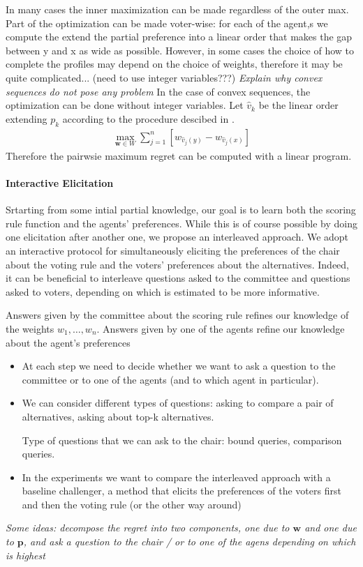 \documentclass[12pt]{article}
\newcommand{\pprofile}{\textbf{p}}%
\newcommand{\w}{\textbf{w}}%
\begin{document}
In many cases the inner maximization can be made regardless of the outer max.
Part of the optimization can be made voter-wise: for each of the agent,s we compute the extend the partial preference into a linear order that makes the gap between y and x as wide as possible.
However, in some cases the choice of how to complete the profiles may depend on the choice of weights, therefore it may be quite complicated...  (need to use integer variables???)
\medskip
 {\em Explain why convex sequences do not pose any problem}
In the case of convex sequences, the optimization can be done without integer variables.
Let $\hat{v}_k$ be the linear order extending $p_k$ according to the procedure descibed in \cite{Lu2011}.
\begin{align*}
\max_{\w \in W} \sum_{j=1}^{n}  [w_{\hat{v}_j(y)} - w_{\hat{v}_j(x)}]
\end{align*}
Therefore the pairwsie maximum regret can be computed with a linear program.


\paragraph{Interactive Elicitation}
Srtarting from some intial partial knowledge, our goal is to learn both the scoring rule function and the agents' preferences.
While this is of course possible by doing one elicitation after another one, we propose an interleaved approach.
We adopt an interactive  protocol for simultaneously eliciting the preferences of the chair about the voting rule and the voters' preferences about the alternatives.
Indeed, it can be beneficial to interleave questions asked to the committee and questions asked to voters, depending on which is estimated to be more informative.

Answers given by the committee about the scoring rule refines our knowledge of the weights $w_1,\ldots,w_n$.
Answers given by one of the agents refine our knowledge about the agent's preferences

\begin{itemize}
\item At each step we need to decide whether we want to ask a question to the committee or to one of the agents (and to which agent in particular). 


\item We can consider different types of questions: asking to compare a pair of alternatives, asking about top-k alternatives.

Type of questions that we can ask to the chair:
bound queries, comparison queries.

\item In the experiments we want to compare the interleaved approach with a baseline challenger, a method  that elicits the preferences of the voters first and then the voting rule (or the other way around)
\end{itemize}

{\em Some ideas: decompose the regret into two components, one due to $\w$ and one due to $\pprofile$, and ask a question to the chair / or to one of the agens depending on which is highest}



 
\end{document}
